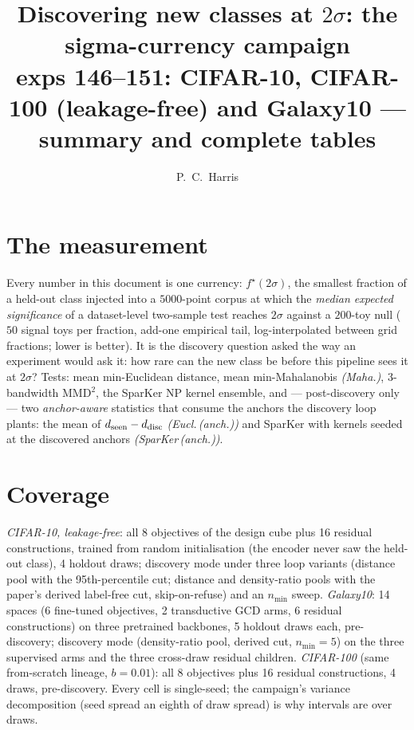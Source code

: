 \documentclass[10pt]{article}
\title{Discovering new classes at $2\sigma$: the sigma-currency campaign\\
\large exps 146--151: CIFAR-10, CIFAR-100 (leakage-free) and Galaxy10 --- summary and complete tables}
\author{P.~C.~Harris}
\begin{document}
\maketitle

\section*{The measurement}
Every number in this document is one currency: $f^\star(2\sigma)$, the
smallest fraction of a held-out class injected into a $5000$-point corpus at
which the \emph{median expected significance} of a dataset-level two-sample
test reaches $2\sigma$ against a $200$-toy null ($50$ signal toys per
fraction, add-one empirical tail, log-interpolated between grid fractions;
lower is better).  It is the discovery question asked the way an experiment
would ask it: how rare can the new class be before this pipeline sees it at
$2\sigma$?  Tests: mean min-Euclidean distance, mean min-Mahalanobis
\emph{(Maha.)}, 3-bandwidth MMD$^2$, the SparKer NP kernel ensemble, and ---
post-discovery only --- two \emph{anchor-aware} statistics that consume the
anchors the discovery loop plants: the mean of $d_{\rm seen}-d_{\rm disc}$
\emph{(Eucl.\,(anch.))} and SparKer with kernels seeded at the discovered
anchors \emph{(SparKer\,(anch.))}.

\section*{Coverage}
\emph{CIFAR-10, leakage-free}: all 8 objectives of the design cube plus 16
residual constructions, trained from random initialisation (the encoder never
saw the held-out class), 4 holdout draws; discovery mode under three loop
variants (distance pool with the 95th-percentile cut; distance and
density-ratio pools with the paper's derived label-free cut, skip-on-refuse)
and an $n_{\min}$ sweep.  \emph{Galaxy10}: 14 spaces (6 fine-tuned
objectives, 2 transductive GCD arms, 6 residual constructions) on three
pretrained backbones, 5 holdout draws each, pre-discovery; discovery mode
(density-ratio pool, derived cut, $n_{\min}{=}5$) on the three supervised
arms and the three cross-draw residual children.  \emph{CIFAR-100}
(same from-scratch lineage, $b{=}0.01$): all 8 objectives plus 16 residual
constructions, 4 draws, pre-discovery.  Every cell is single-seed; the
campaign's variance decomposition (seed spread an eighth of draw spread) is
why intervals are over draws.
\end{document}
